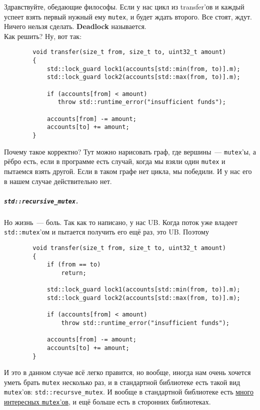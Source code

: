 \documentclass{article}
\begin{document}
    Здравствуйте, обедающие философы. Если у нас цикл из transfer'ов и каждый успеет взять первый нужный ему \Verb|mutex|, и будет ждать второго. Все стоят, ждут. Ничего нельзя сделать. \textbf{Deadlock} называется.\\
    Как решить? Ну, вот так:
    \begin{verbatim}
        void transfer(size_t from, size_t to, uint32_t amount)
        {
            std::lock_guard lock1(accounts[std::min(from, to)].m);
            std::lock_guard lock2(accounts[std::max(from, to)].m);
            
            if (accounts[from] < amount)
               throw std::runtime_error("insufficient funds");
            
            accounts[from] -= amount;
            accounts[to] += amount;
        }
    \end{verbatim}
    Почему такое корректно? Тут можно нарисовать граф, где вершины~--- \Verb|mutex|'ы, а рёбро есть, если в программе есть случай, когда мы взяли один \Verb|mutex| и пытаемся взять другой. Если в таком графе нет цикла, мы победили. И у нас его в нашем случае действительно нет.
    \subparagraph{\texttt{std::recursive_mutex}.}
    Но жизнь~--- боль. Так как то написано, у нас UB. Когда поток уже владеет \texttt{std::mutex}'ом и пытается получить его ещё раз, это UB. Поэтому
    \begin{verbatim}
        void transfer(size_t from, size_t to, uint32_t amount)
        {
            if (from == to)
                return;

            std::lock_guard lock1(accounts[std::min(from, to)].m);
            std::lock_guard lock2(accounts[std::max(from, to)].m);
            
            if (accounts[from] < amount)
                throw std::runtime_error("insufficient funds");
            
            accounts[from] -= amount;
            accounts[to] += amount;
        }
    \end{verbatim}
    И это в данном случае всё легко правится, но вообще, иногда нам очень хочется уметь брать \Verb|mutex| несколько раз, и в стандартной библиотеке есть такой вид \Verb|mutex|'ов: \texttt{std::recursve_mutex}. И вообще в стандартной библиотеке есть \href{https://en.cppreference.com/w/cpp/thread#Mutual_exclusion}{много интересных \Verb|mutex|'ов}, и ещё больше есть в сторонних библиотеках.
\end{document}
